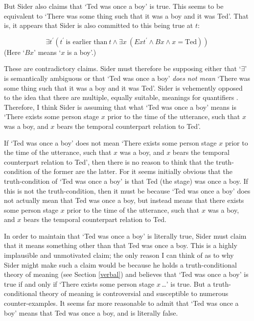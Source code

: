 \documentclass[12pt,twoside]{reedfancy}
\begin{document}
\begin{spacing}{1.25}
But Sider also claims that `Ted was once a boy' is true.  This seems
to be equivalent to `There was some thing such that it was a boy and
it was Ted'.  That is, it appears that Sider is also committed to this
being true at $t$:

\begin{displaymath}
\exists t^{\prime} (t^{\prime}\ \text{is earlier than}\ t \wedge
\exists x\ (Ext^{\prime} \wedge Bx \wedge x = \text{Ted}))
\end{displaymath}
(Here `$Bx$' means `$x$ is a boy'.)

These are contradictory claims.  Sider must therefore be supposing
either that `$\exists$' is semantically ambiguous or that `Ted was
once a boy' {\em does not mean} `There was some thing such that it was
a boy and it was Ted'.  Sider is vehemently opposed to the idea that
there are multiple, equally suitable, meanings for quantifiers
\citeyearpar{sider2001,sider2011b,sider2011d}.  Therefore, I think
Sider is assuming that what `Ted was once a boy' means is `There
exists some person stage $x$ prior to the time of the utterance, such
that $x$ was a boy, and $x$ bears the temporal counterpart relation to
Ted'.

If `Ted was once a boy' does not mean `There exists some person stage
$x$ prior to the time of the utterance, such that $x$ was a boy, and
$x$ bears the temporal counterpart relation to Ted', then there is no
reason to think that the truth-condition of the former are the latter.
For it seems initially obvious that the truth-condition of `Ted was
once a boy' is that Ted (the stage) was once a boy.  If this is not
the truth-condition, then it must be because `Ted was once a boy' does
not actually mean that Ted was once a boy, but instead means that
there exists some person stage $x$ prior to the time of the utterance,
such that $x$ was a boy, and $x$ bears the temporal counterpart
relation to Ted.

In order to maintain that `Ted was once a boy' is literally true,
Sider must claim that it means something other than that Ted was once
a boy.  This is a highly implausible and unmotivated claim; the only
reason I can think of as to why Sider might make such a claim would be
because he holds a truth-conditional theory of meaning (see Section
\ref{verbal}) and believes that `Ted was once a boy' is true if and
only if `There exists some person stage $x$\,\ldots ' is true.  But a
truth-conditional theory of meaning is controversial and susceptible
to numerous counter-examples.  It seems far more reasonable to admit
that `Ted was once a boy' means that Ted was once a boy, and is
literally false.


\end{spacing}
\end{document}
